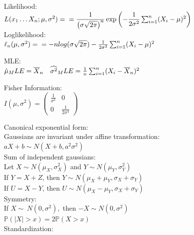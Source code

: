 Likelihood:\\

$L(x_1\dots X_n;\mu,\sigma^2)=\\ 
= \dfrac{1}{\left(\sigma\sqrt{2\pi}\right)^n}\exp{\left(-\dfrac{1}{2\sigma^2}\sum_{i=1}^n (X_i-\mu)^2 \right)}$\\

Loglikelihood:\\

$\ell_n (\mu,\sigma^2)= \\
= -n log(\sigma\sqrt{2\pi})-\frac{1}{2\sigma^2}\sum_{i=1}^n (X_i-\mu)^2 $

MLE:\\

$\hat\mu_MLE = \bar X_ n\\
\quad \widehat{\sigma ^2}_MLE = \frac{1}{n} \sum _{i=1}^{n} (X_ i - \bar X_ n)^2$

Fisher Information:\\

$I(\mu , \sigma ^2) = \begin{pmatrix}  \frac{1}{\sigma ^2} &  0 \\ 0 &  \frac{1}{2 \sigma ^4} \end{pmatrix}$

Canonical exponential form:\\

Gaussians are invariant under affine transformation:\\

$aX+b \sim N(X+b,a^2\sigma^2)$\\

Sum of independent gaussians:\\

Let $X {\sim} N(\mu_X,\sigma_X^2)$ and $Y {\sim} N(\mu_Y,\sigma_Y^2)$\\

If $Y = X + Z$, then $Y \sim N(\mu_X + \mu_Y, \sigma_X + \sigma_Y)$\\

If $U = X - Y$, then $U \sim N(\mu_X - \mu_Y,\sigma_X + \sigma_Y)$\\

Symmetry:\\

If $X \sim\ N(0,\sigma^2),$ then $-X \sim N(0,\sigma^2)$\\

$\mathbb{P}(|X|>x) = 2\mathbb{P}(X>x)$\\

Standardization:\\

